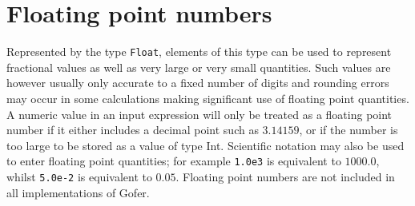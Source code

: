 \section{Floating point numbers}
Represented by the type \verb"Float", elements of this type can be  used  to
represent fractional values  as  well  as  very  large  or  very  small
quantities.  Such values are however usually only accurate to  a  fixed
number of digits and rounding errors may  occur  in  some  calculations
making significant use of floating point quantities.  A  numeric  value
in an input expression will only be treated as a floating point  number
if it either includes a decimal point such as $3.14159$, or if the number
is too large to be stored as a value of type Int.  Scientific  notation
may also be used to enter floating point quantities; for example  \verb"1.0e3"
is equivalent to $1000.0$, whilst \verb"5.0e-2" is equivalent to $0.05$.
Floating point numbers are not included in all implementations of
Gofer.


